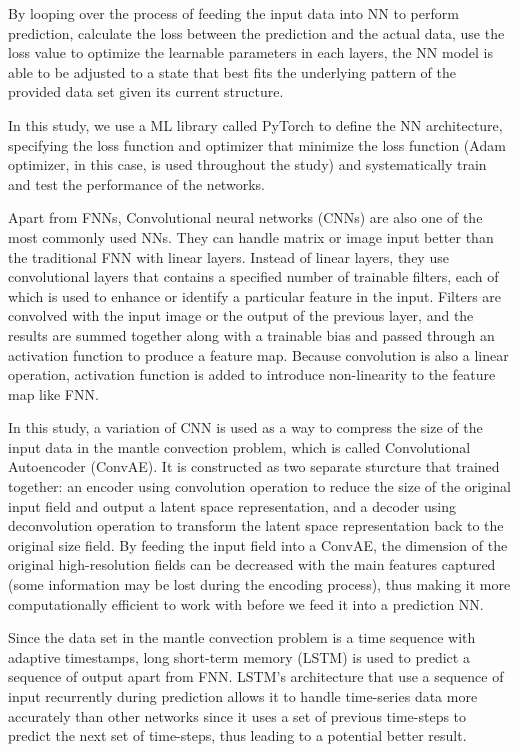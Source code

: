 By looping over the process of feeding the input data into NN to perform prediction, calculate the loss between the prediction and the actual data, use the loss value to optimize the learnable parameters in each layers, the NN model is able to be adjusted to a state that best fits the underlying pattern of the provided data set given its current structure.

In this study, we use a ML library called PyTorch to define the NN architecture, specifying the loss function and optimizer that minimize the loss function (Adam optimizer, in this case, is used throughout the study) and systematically train and test the performance of the networks.

Apart from FNNs, Convolutional neural networks (CNNs) are also one of the most commonly used NNs. They can handle matrix or image input better than the traditional FNN with linear layers. Instead of linear layers, they use convolutional layers that contains a specified number of trainable filters, each of which is used to enhance or identify a particular feature in the input. Filters are convolved with the input image or the output of the previous layer, and the results are summed together along with a trainable bias and passed through an activation function to produce a feature map. Because convolution is also a linear operation, activation function is added to introduce non-linearity to the feature map like FNN.

In this study, a variation of CNN is used as a way to compress the size of the input data in the mantle convection problem, which is called Convolutional Autoencoder (ConvAE). It is constructed as two separate sturcture that trained together: an encoder using convolution operation to reduce the size of the original input field and output a latent space representation, and a decoder using deconvolution operation to transform the latent space representation back to the original size field. By feeding the input field into a ConvAE, the dimension of the original high-resolution fields can be decreased with the main features captured (some information may be lost during the encoding process), thus making it more computationally efficient to work with before we feed it into a prediction NN.

Since the data set in the mantle convection problem is a time sequence with adaptive timestamps, long short-term memory (LSTM) is used to predict a sequence of output apart from FNN. LSTM's architecture that use a sequence of input recurrently during prediction allows it to handle time-series data more accurately than other networks since it uses a set of previous time-steps to predict the next set of time-steps, thus leading to a potential better result.


